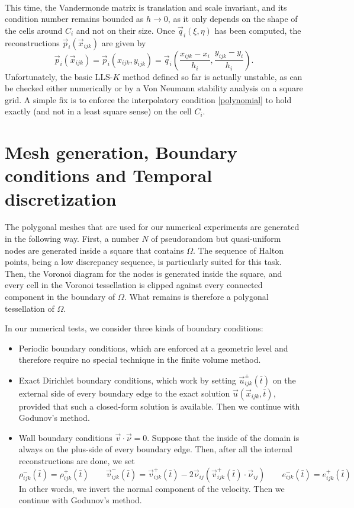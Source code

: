 \\
This time, the Vandermonde matrix is translation and scale invariant,
and its condition number remains bounded as $h\rightarrow 0$, as it only
depends on the shape of the cells around $C_{i}$ and not on their size.
Once $\vec{q}_{i}(\xi,\eta)$ has been computed, the reconstructions
$\vec{p}_{i}(\vec{x}_{ijk})$ are given by
\begin{equation*}
\vec{p}_{i}(\vec{x}_{ijk})
= \vec{p}_{i}(x_{ijk},y_{ijk})
= \vec{q}_{i} \left( \frac{x_{ijk}-x_{i}}{h_{i}},\frac{y_{ijk}-y_{i}}{h_{i}} \right).
\end{equation*}
Unfortunately, the basic LLS-$K$ method defined so far is actually unstable,
as can be checked either numerically or by a Von Neumann stability analysis
on a square grid. A simple fix is to enforce the interpolatory
condition \eqref{polynomial} to hold exactly (and not in a least square
sense) on the cell $C_i$.

\section{Mesh generation, Boundary conditions and Temporal discretization}
\label{sec:boundary-condtions}
\label{sec:mesh-generation}
\label{sec:temporal-discretization}
The polygonal meshes that are used for our numerical experiments
are generated in the following way.
First, a number $N$ of pseudorandom but quasi-uniform nodes are
generated inside a square that contains $\Omega$. The sequence
of Halton points, being a low discrepancy sequence, is particularly
suited for this task.
Then, the Voronoi diagram for the nodes is generated inside the square,
and every cell in the Voronoi tessellation is clipped against every
connected component in the boundary of $\Omega$.
What remains is therefore a polygonal tessellation of $\Omega$.

In our numerical tests, we consider three kinds of boundary conditions:
\begin{itemize}
\item Periodic boundary conditions, which are enforced at a geometric level
and therefore require no special technique in the finite volume method.
\item Exact Dirichlet boundary conditions, which work by setting
$\vec{u}_{ijk}^{\pm}(\bar{t})$ on the external side of every boundary edge
to the exact solution $\vec{u}(\vec{x}_{ijk},\bar{t})$, provided that such
a closed-form solution is available. Then we continue with Godunov's method.
\item Wall boundary conditions $\vec{v} \cdot \vec{\nu} = 0$.
Suppose that the inside of the domain is always on the plus-side of every
boundary edge. Then, after all the internal reconstructions are done, we set
\[
\rho_{ijk}^{-}(\bar{t}) = \rho_{ijk}^{+}(\bar{t}) \qquad
\vec{v}_{ijk}^{-}(\bar{t}) = \vec{v}_{ijk}^{+}(\bar{t})
	- 2 \vec{\nu}_{ij} (\vec{v}_{ijk}^{+}(\bar{t}) \cdot \vec{\nu}_{ij}) \qquad
e_{ijk}^{-}(\bar{t}) = e_{ijk}^{+}(\bar{t})
\]
In other words, we invert the normal component of the velocity.
Then we continue with Godunov's method.
\end{itemize}

